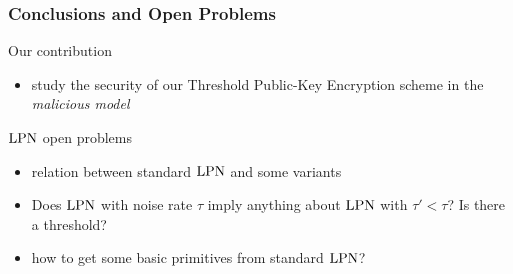 \begin{frame}
 \frametitle{Conclusions and Open Problems}
 
 \begin{block}{Our contribution}
\begin{itemize}
 \item study the security of our Threshold Public-Key Encryption scheme in the \emph{malicious model}
\end{itemize}
  
 \end{block}
 
 \begin{block}{$\mathrm{LPN}$ open problems}
  \begin{itemize}
   \item<2-> relation between standard $\mathrm{LPN}$ and some variants
   \item<3-> Does $\mathrm{LPN}$ with noise rate $\tau$ imply anything about $\mathrm{LPN}$ with $\tau' < \tau$? Is there a threshold?
   \item<4-> how to get some basic primitives from standard $\mathrm{LPN}$?
  \end{itemize}

 \end{block}
 

\end{frame}
